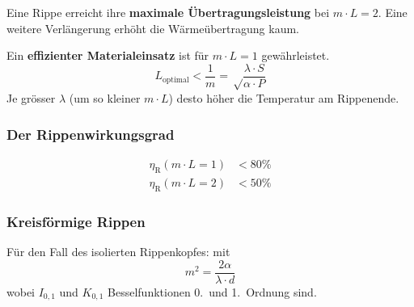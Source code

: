 			Eine Rippe erreicht ihre \textbf{maximale Übertragungsleistung} bei $m\cdot L = 2$. Eine weitere Verlängerung erhöht die Wärme\-über\-tragung kaum.

			Ein \textbf{effizienter Materialeinsatz} ist für $m\cdot L = 1$ gewähr\-leistet.
			\[
				L_\text{optimal} < \frac{1}{m} = \sqrt \frac{\lambda \cdot S}{\alpha \cdot P}
			\]
			Je grösser $\lambda$ (um so kleiner $m\cdot L$) desto höher die Temperatur am Rippenende.

		\subsubsection{Der Rippenwirkungsgrad} %
			\begin{align*}
				\eta_\text{R}(m\cdot L = 1) &< 80\% \\
				\eta_\text{R}(m\cdot L = 2) &< 50\%
			\end{align*}

		\subsubsection{Kreisförmige Rippen} %
			Für den Fall des isolierten Rippenkopfes:
			mit \[
				m^2 = \frac{2\alpha}{\lambda \cdot d}
			\]
			wobei $I_{0,1}$ und $K_{0,1}$ Besselfunktionen 0.~und 1.~Ordnung sind.
